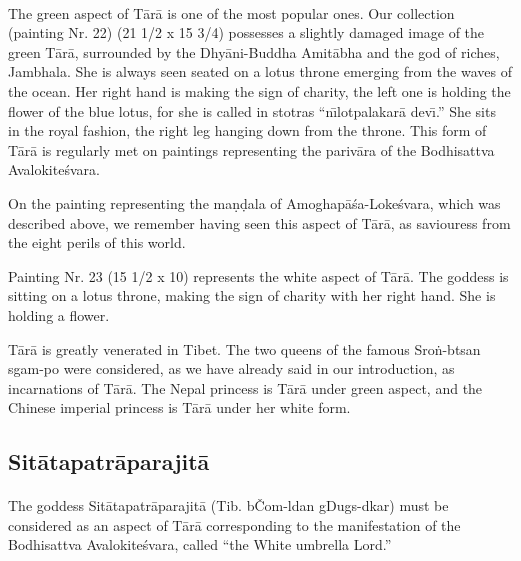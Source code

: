 \documentclass[a4paper, 12pt, oneside]{article}
\begin{document}
\paragraph{}
The green aspect of T\={a}r\={a} is one of the most popular ones. Our collection (painting Nr. 22) (21 1/2 x 15 3/4) possesses a slightly damaged image of the green T\={a}r\={a}, surrounded by the Dhy\={a}ni-Buddha Amit\={a}bha and the god of riches, Jambhala. She is always seen seated on a lotus throne emerging from the waves of the ocean. Her right hand is making the sign of charity, the left one is holding the flower of the blue lotus, for she is called in stotras ``n\={\i}lotpalakar\={a} dev\={\i}.'' She sits in the royal fashion, the right leg hanging down from the throne. This form of T\={a}r\={a} is regularly met on paintings representing the pariv\={a}ra of the Bodhisattva Avalokite\'{s}vara.

On the painting representing the ma\d{n}\d{d}ala of Amoghap\={a}\'{s}a-Loke\'{s}vara, which was described above, we remember having seen this aspect of T\={a}r\={a}, as saviouress from the eight perils of this world.

\bigskip

Painting Nr. 23 (15 1/2 x 10) represents the white aspect of T\={a}r\={a}. The goddess is sitting on a lotus throne, making the sign of charity with her right hand. She is holding a flower.

\bigskip

T\={a}r\={a} is greatly venerated in Tibet. The two queens of the famous Sro\.{n}-btsan sgam-po were considered, as we have already said in our introduction, as incarnations of T\={a}r\={a}. The Nepal princess is T\={a}r\={a} under green aspect, and the Chinese imperial princess is T\={a}r\={a} under her white form.

\subsection{Sit\={a}tapatr\={a}parajit\={a}}
\paragraph{}
The goddess Sit\={a}tapatr\={a}parajit\={a} (Tib. bČom-ldan gDugs-dkar) must be considered as an aspect of T\={a}r\={a} corresponding to the manifestation of the Bodhisattva Avalokite\'{s}vara, called ``the White umbrella Lord.''
\end{document}
